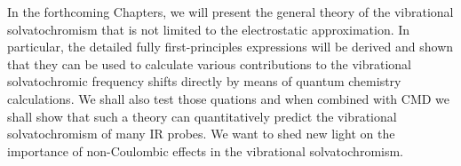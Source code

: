 \documentclass[a4paper,titlepage,twoside,fleqn,12pt]{book}
\begin{document}
\begin{refsection}
In the forthcoming Chapters, we will present the general theory of the vibrational
solvatochromism that is not limited to the electrostatic approximation. 
In particular, the detailed fully first\hyp{}principles expressions
will be derived and shown 
that they can be used to calculate various contributions to the vibrational solvatochromic frequency
shifts directly by means of quantum chemistry calculations. We shall also test those quations 
and when combined with CMD we shall show that such a theory can quantitatively predict the
vibrational solvatochromism of many IR probes. We want to shed new light
on the importance of non\hyp{}Coulombic effects
in the vibrational solvatochromism.

\printbibliography[heading=subbibintoc,title={References}]
\end{refsection}

\end{document}

